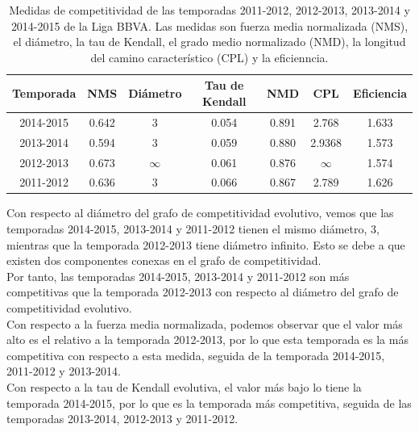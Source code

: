 \begin{table}[h]
\centering
\caption[Medidas de competitividad]{Medidas de competitividad de las temporadas 2011-2012, 2012-2013, 2013-2014 y 2014-2015 de la Liga BBVA. Las medidas son fuerza media normalizada (NMS), el diámetro, la tau de Kendall, el grado medio normalizado (NMD), la longitud del camino característico (CPL) y la eficienncia.}
\label{tbl:medidas}
\begin{tabular}{@{}ccccccc@{}}
\toprule
Temporada & NMS & Diámetro & Tau de Kendall & NMD & CPL & Eficiencia \\ \midrule
2014-2015 & 0.642                    & 3        & 0.054          & 0.891                   & 2.768                              & 1.633      \\
2013-2014 & 0.594                    & 3        & 0.059          & 0.880                   & 2.9368                             & 1.573      \\
2012-2013 & 0.673                    & $\infty$ & 0.061          & 0.876                   & $\infty$                           & 1.574      \\
2011-2012 & 0.636                    & 3        & 0.066          & 0.867                   & 2.789                              & 1.626      \\ \bottomrule
\end{tabular}
\end{table}

Con respecto al diámetro del grafo de competitividad evolutivo, vemos que las temporadas 2014-2015, 2013-2014 y 2011-2012 tienen el mismo diámetro, 3, mientras que la temporada 2012-2013 tiene diámetro infinito. Esto se debe a que existen dos componentes conexas en el grafo de competitividad.\\
Por tanto, las temporadas 2014-2015, 2013-2014 y 2011-2012 son más competitivas que la temporada 2012-2013 con respecto al diámetro del grafo de competitividad evolutivo.\\

Con respecto a la fuerza media normalizada, podemos observar que el valor más alto es el relativo a la temporada 2012-2013, por lo que esta temporada es la más competitiva con respecto a esta medida, seguida de la temporada 2014-2015, 2011-2012 y 2013-2014.\\

Con respecto a la tau de Kendall evolutiva, el valor más bajo lo tiene la temporada 2014-2015, por lo que es la temporada más competitiva, seguida de las temporadas 2013-2014, 2012-2013 y 2011-2012.\\

